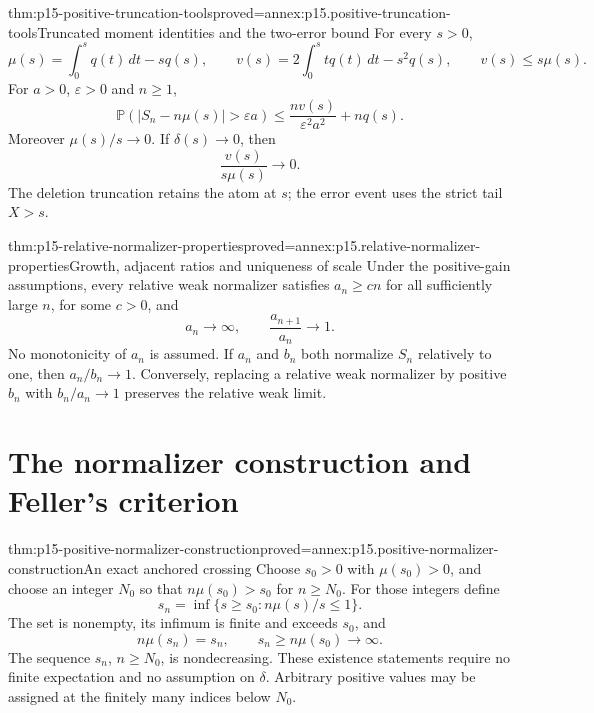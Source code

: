 \begin{hblemma}{thm:p15-positive-truncation-tools}{proved=annex:p15.positive-truncation-tools}{Truncated moment identities and the two-error bound}
For every \(s>0\),
\[
 \mu(s)=\int_0^s q(t)\,dt-sq(s),\qquad
 v(s)=2\int_0^s t q(t)\,dt-s^2q(s),\qquad
 v(s)\leq s\mu(s).
\]
For \(a>0\), \(\varepsilon>0\) and \(n\geq1\),
\[
 \mathbb P(|S_n-n\mu(s)|>\varepsilon a)
 \leq \frac{n v(s)}{\varepsilon^2a^2}+n q(s).
\]
Moreover \(\mu(s)/s\to0\). If \(\delta(s)\to0\), then
\[
 \frac{v(s)}{s\mu(s)}\longrightarrow0.
\]
The deletion truncation retains the atom at \(s\); the error event
uses the strict tail \(X>s\).
\end{hblemma}

\begin{hblemma}{thm:p15-relative-normalizer-properties}{proved=annex:p15.relative-normalizer-properties}{Growth, adjacent ratios and uniqueness of scale}
Under the positive-gain assumptions, every relative weak normalizer
satisfies \(a_n\geq c n\) for all sufficiently large \(n\), for some
\(c>0\), and
\[
 a_n\longrightarrow\infty,\qquad
 \frac{a_{n+1}}{a_n}\longrightarrow1.
\]
No monotonicity of \(a_n\) is assumed. If \(a_n\) and \(b_n\) both
normalize \(S_n\) relatively to one, then \(a_n/b_n\to1\).
Conversely, replacing a relative weak normalizer by positive
\(b_n\) with \(b_n/a_n\to1\) preserves the relative weak limit.
\end{hblemma}

\section{The normalizer construction and Feller's criterion}
\label{sec:p15-feller-positive-criterion}

\begin{hblemma}{thm:p15-positive-normalizer-construction}{proved=annex:p15.positive-normalizer-construction}{An exact anchored crossing}
Choose \(s_0>0\) with \(\mu(s_0)>0\), and choose an integer \(N_0\)
so that \(n\mu(s_0)>s_0\) for \(n\geq N_0\).
For those integers define
\[
 s_n=\inf\{s\geq s_0:n\mu(s)/s\leq1\}.
\]
The set is nonempty, its infimum is finite and exceeds \(s_0\), and
\[
 n\mu(s_n)=s_n,\qquad
 s_n\geq n\mu(s_0)\longrightarrow\infty.
\]
The sequence \(s_n\), \(n\geq N_0\), is nondecreasing.
These existence statements require no finite expectation and no
assumption on \(\delta\). Arbitrary positive values may be assigned
at the finitely many indices below \(N_0\).
\end{hblemma}


